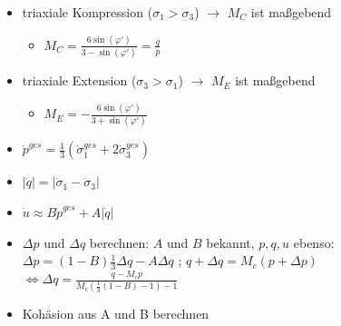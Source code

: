 \documentclass[fleqn,twoside]{article}
\newcommand{\abs}[1]{\ensuremath{\left\vert#1\right\vert}}
\begin{document}
\begin{itemize}
	\item triaxiale Kompression ($\sigma_1 > \sigma_3$) $\rightarrow$ $M_C$ ist maßgebend
	\begin{itemize}
	    \item $M_C=\frac{6\sin(\varphi')}{3-\sin(\varphi')} = \frac{q}{p}$
	\end{itemize}
	\item triaxiale Extension ($\sigma_3 > \sigma_1$) $\rightarrow$ $M_E$ ist maßgebend
	\begin{itemize}
	    \item $M_E=-\frac{6\sin(\varphi')}{3+\sin(\varphi')}$
	\end{itemize}
	\item $\dot{p}^{ges}=\frac{1}{3}(\dot{\sigma}_1^{ges}+2\dot{\sigma}_3^{ges})$
	\item $\abs{\dot{q}}=\abs{\dot{\sigma}_1-\dot{\sigma}_3}$
	\item $\dot{u}\approx B\dot{p}^{ges}+A \abs{\dot{q}}$
	\item $\Delta p$ und $\Delta q$ berechnen: $A$ und $B$ bekannt, $p,q,u$ ebenso:
	$\Delta p = (1-B) \frac{1}{3} \Delta q-A\Delta q$ ;
	$q+ \Delta q = M_c(p+\Delta p)$
	$\boxed{\Leftrightarrow \Delta q=\frac{q-M_cp}{M_c\left(\frac13(1-B)-1\right)-1}}$
	\item Kohäsion aus A und B berechnen
	

\end{itemize}
\end{document}
